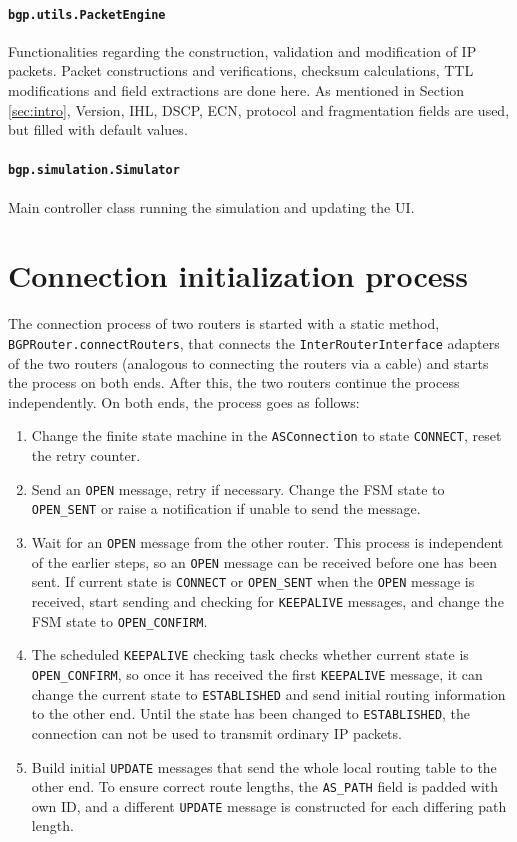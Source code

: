 \documentclass[11pt,a4paper,titlepage]{report}
\begin{document}
\paragraph{\texttt{bgp.utils.PacketEngine}}
Functionalities regarding the construction, validation and modification of IP packets. Packet constructions and verifications, checksum calculations, TTL modifications and field extractions are done here. As mentioned in Section \ref{sec:intro}, Version, IHL, DSCP, ECN, protocol and fragmentation fields are used, but filled with default values.

\paragraph{\texttt{bgp.simulation.Simulator}}
Main controller class running the simulation and updating the UI.


\section{Connection initialization process}\label{sec:init}
The connection process of two routers is started with a static method, \texttt{BGPRouter.connectRouters}, that connects the \texttt{InterRouterInterface} adapters of the two routers (analogous to connecting the routers via a cable) and starts the process on both ends. After this, the two routers continue the process independently. On both ends, the process goes as follows:
\begin{enumerate}
\item Change the finite state machine in the \texttt{ASConnection} to state \texttt{CONNECT}, reset the retry counter.
\item Send an \texttt{OPEN} message, retry if necessary. Change the FSM state to \texttt{OPEN\_SENT} or raise a notification if unable to send the message.
\item Wait for an \texttt{OPEN} message from the other router. This process is independent of the earlier steps, so an \texttt{OPEN} message can be received before one has been sent. If current state is \texttt{CONNECT} or \texttt{OPEN\_SENT} when the \texttt{OPEN} message is received, start sending and checking for \texttt{KEEPALIVE} messages, and change the FSM state to \texttt{OPEN\_CONFIRM}.
\item The scheduled \texttt{KEEPALIVE} checking task checks whether current state is \texttt{OPEN\_CONFIRM}, so once it has received the first \texttt{KEEPALIVE} message, it can change the current state to \texttt{ESTABLISHED} and send initial routing information to the other end. Until the state has been changed to \texttt{ESTABLISHED}, the connection can not be used to transmit ordinary IP packets.
\item Build initial \texttt{UPDATE} messages that send the whole local routing table to the other end. To ensure correct route lengths, the \texttt{AS\_PATH} field is padded with own ID, and a different \texttt{UPDATE} message is constructed for each differing path length.
\end{enumerate}
\end{document}

